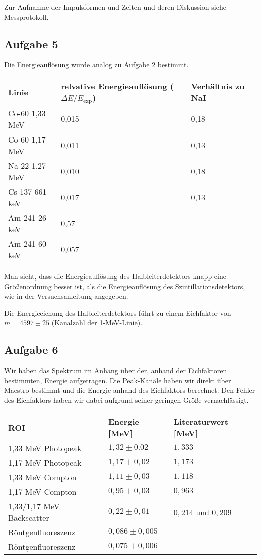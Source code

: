 \documentclass[a4paper,german,12pt,smallheadings]{scrartcl}
\begin{document}
Zur Aufnahme der Impulsformen und Zeiten und deren Diskussion siehe Messprotokoll.

\subsection{Aufgabe 5}

Die Energieauflösung wurde analog zu Aufgabe 2 bestimmt.

\begin{tabular}{l|l|l}
  Linie & relvative Energieauflösung ($\Delta E/E_\text{exp}$) & Verhältnis zu NaI \\
  \hline
  Co-60 1{,}33 MeV & 0{,}015 & 0{,}18\\
  Co-60 1{,}17 MeV & 0{,}011 & 0{,}13\\
  Na-22 1{,}27 MeV & 0{,}010 & 0{,}18\\
  Cs-137 661 keV & 0{,}017 & 0{,}13\\
  Am-241 26 keV & 0{,}57 \\
  Am-241 60 keV & 0{,}057
\end{tabular}
\vspace{22pt}

Man sieht, dass die Energieauflösung des Halbleiterdetektors knapp eine
Größenordnung besser ist, als die Energieauflösung des Szintillationsdetektors,
wie in der Versuchsanleitung angegeben.

Die Energieeichung des Halbleiterdetektors führt zu einem Eichfaktor von $m =
4597\pm25$ (Kanalzahl der 1-MeV-Linie).


\subsection{Aufgabe 6}

Wir haben das Spektrum im Anhang über der, anhand der Eichfaktoren bestimmten,
Energie aufgetragen. Die Peak-Kanäle haben wir direkt über Maestro bestimmt und
die Energie anhand des Eichfaktors berechnet. Den Fehler des Eichfaktors haben
wir dabei aufgrund seiner geringen Größe vernachlässigt.

\begin{tabular}{l|l|l}
  ROI & Energie [MeV] & Literaturwert [MeV]\\
  \hline
  1{,}33 MeV Photopeak & $1,32\pm0.02$ & $1,333$\\
  1{,}17 MeV Photopeak & $1,17\pm0,02$ & $1,173$\\
  1{,}33 MeV Compton   & $1,11\pm0,03$ & $1,118$\\
  1{,}17 MeV Compton   & $0,95\pm0,03$ & $0,963$\\
  1{,}33/1{,}17 MeV Backscatter   & $0,22\pm0,01$ & $0,214$ und $0,209$\\
  Röntgenfluoreszenz   & $0,086\pm0,005$\\
  Röntgenfluoreszenz   & $0,075\pm0,006$
\end{tabular}
\vspace{22pt}
\end{document}

